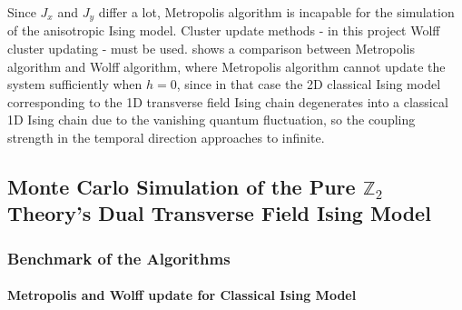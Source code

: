 \documentclass[hyperref, a4paper]{article}
\newcommand*{\Ztwo}{$\mathbb{Z}_2$ }
\newcommand*{\cim}{classical Ising model }
\newcommand*{\CIM}{Classical Ising Model }
\begin{document}
Since $J_x$ and $J_y$ differ a lot, Metropolis algorithm is incapable for the simulation of the anisotropic Ising model.
Cluster update methods - in this project Wolff cluster updating \cite{Wolff_1989} - must be used.
 shows a comparison between Metropolis algorithm and Wolff algorithm, 
where Metropolis algorithm cannot update the system sufficiently when $h=0$, 
since in that case the 2D \cim corresponding to the 1D transverse field Ising chain degenerates into a classical 1D Ising chain due to the vanishing quantum fluctuation, 
so the coupling strength in the temporal direction approaches to infinite.

\subsection{Monte Carlo Simulation of the Pure \Ztwo Theory's Dual Transverse Field Ising Model}

\subsubsection{Benchmark of the Algorithms}

\paragraph{Metropolis and Wolff update for \CIM}
\end{document}
